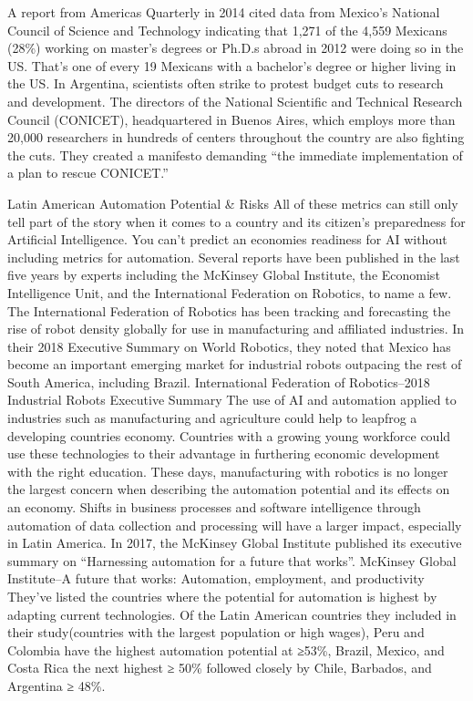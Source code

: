 \documentclass[conference]{IEEEtran}
\begin{document}
A report from Americas Quarterly in 2014 cited data from Mexico's National Council of Science and Technology indicating that 1,271 of the 4,559 Mexicans (28\%) working on master's degrees or Ph.D.s abroad in 2012 were doing so in the US. That's one of every 19 Mexicans with a bachelor's degree or higher living in the US.
In Argentina, scientists often strike to protest budget cuts to research and development. The directors of the National Scientific and Technical Research Council (CONICET), headquartered in Buenos Aires, which employs more than 20,000 researchers in hundreds of centers throughout the country are also fighting the cuts. They created a manifesto demanding ``the immediate implementation of a plan to rescue CONICET.''

Latin American Automation Potential \& Risks
All of these metrics can still only tell part of the story when it comes to a country and its citizen's preparedness for Artificial Intelligence. You can't predict an economies readiness for AI without including metrics for automation. Several reports have been published in the last five years by experts including the McKinsey Global Institute, the Economist Intelligence Unit, and the International Federation on Robotics, to name a few.
The International Federation of Robotics has been tracking and forecasting the rise of robot density globally for use in manufacturing and affiliated industries. In their 2018 Executive Summary on World Robotics, they noted that Mexico has become an important emerging market for industrial robots outpacing the rest of South America, including Brazil.
International Federation of Robotics--2018 Industrial Robots Executive Summary
The use of AI and automation applied to industries such as manufacturing and agriculture could help to leapfrog a developing countries economy. Countries with a growing young workforce could use these technologies to their advantage in furthering economic development with the right education.
These days, manufacturing with robotics is no longer the largest concern when describing the automation potential and its effects on an economy. Shifts in business processes and software intelligence through automation of data collection and processing will have a larger impact, especially in Latin America. In 2017, the McKinsey Global Institute published its executive summary on ``Harnessing automation for a future that works''.
McKinsey Global Institute--A future that works: Automation, employment, and productivity
They've listed the countries where the potential for automation is highest by adapting current technologies. Of the Latin American countries they included in their study(countries with the largest population or high wages), Peru and Colombia have the highest automation potential at ≥53\%, Brazil, Mexico, and Costa Rica the next highest ≥ 50\% followed closely by Chile, Barbados, and Argentina ≥ 48\%.
\end{document}
